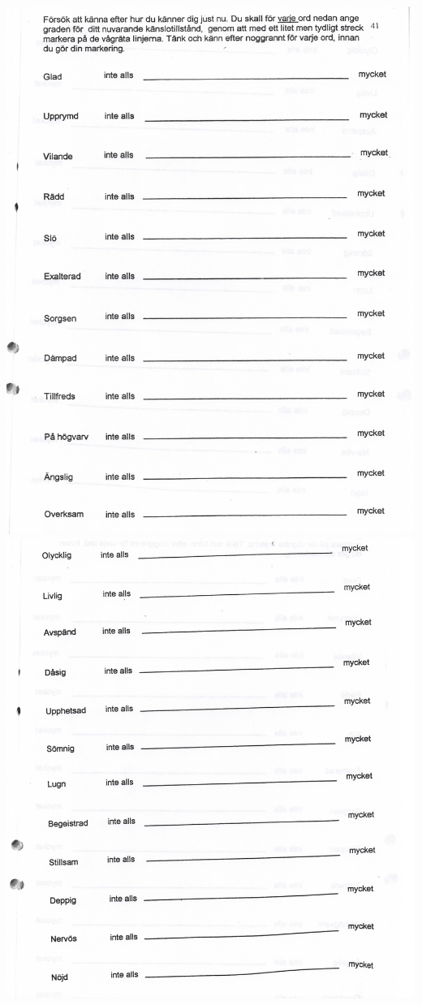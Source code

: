 \section{}\label{app:g}
\includegraphics[height=.9\textheight]{Appendencies/AppendixG}
\clearpage
\includegraphics[height=.9\textheight]{Appendencies/AppendixG2}
